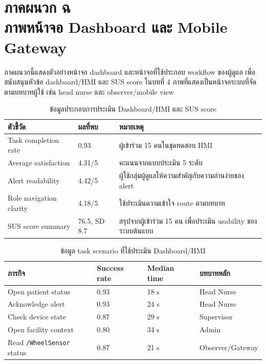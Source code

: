 \chapter[ภาพหน้าจอ Dashboard และ Mobile Gateway]{\texorpdfstring{ภาคผนวก ฉ\\ภาพหน้าจอ Dashboard และ Mobile Gateway}{Appendix F: Dashboard and Mobile Gateway Screens}}
\label{app:dashboard_mobile_screens}

ภาคผนวกนี้แสดงตัวอย่างหน้าจอ dashboard และหน้าจอที่ใช้ประกอบ workflow ของผู้ดูแล เพื่อสนับสนุนหัวข้อ dashboard/HMI และ SUS score ในบทที่ 4 ภาพที่แสดงเป็นหน้าจอระบบที่จัดตามบทบาทผู้ใช้ เช่น head nurse และ observer/mobile view

\begin{table}[H]
    \centering
    \caption{ข้อมูลประกอบการประเมิน Dashboard/HMI และ SUS score}
    \label{tab:app_hmi_sus_summary}
    \renewcommand{\arraystretch}{1.18}
    \small
    \setlength{\tabcolsep}{3pt}
    \begin{tabular}{|L{0.34\textwidth}|L{0.20\textwidth}|L{0.34\textwidth}|}
        \hline
        \textbf{ตัวชี้วัด} & \textbf{ผลที่พบ} & \textbf{หมายเหตุ} \\ \hline
        Task completion rate & 0.93 & ผู้เข้าร่วม 15 คนในชุดทดสอบ HMI \\ \hline
        Average satisfaction & 4.31/5 & คะแนนจากแบบประเมิน 5 ระดับ \\ \hline
        Alert readability & 4.42/5 & ผู้ใช้กลุ่มผู้ดูแลให้ความสำคัญกับความอ่านง่ายของ alert \\ \hline
        Role navigation clarity & 4.18/5 & ใช้ประเมินความเข้าใจ route ตามบทบาท \\ \hline
        SUS score summary & 76.5, SD 8.7 & สรุปจากผู้เข้าร่วม 15 คน เพื่อประเมิน usability ของระบบต้นแบบ \\ \hline
    \end{tabular}
\end{table}

\begin{table}[H]
    \centering
    \caption{ข้อมูล task scenario ที่ใช้ประเมิน Dashboard/HMI}
    \label{tab:app_hmi_task_result}
    \renewcommand{\arraystretch}{1.18}
    \small
    \setlength{\tabcolsep}{3pt}
    \begin{tabular}{|L{0.38\textwidth}|L{0.18\textwidth}|L{0.18\textwidth}|L{0.16\textwidth}|}
        \hline
        \textbf{ภารกิจ} & \textbf{Success rate} & \textbf{Median time} & \textbf{บทบาทหลัก} \\ \hline
        Open patient status & 0.93 & 18 s & Head Nurse \\ \hline
        Acknowledge alert & 0.93 & 24 s & Head Nurse \\ \hline
        Check device state & 0.87 & 29 s & Supervisor \\ \hline
        Open facility context & 0.80 & 34 s & Admin \\ \hline
        Read \texttt{/WheelSensor} status & 0.87 & 21 s & Observer/Gateway \\ \hline
    \end{tabular}
\end{table}

